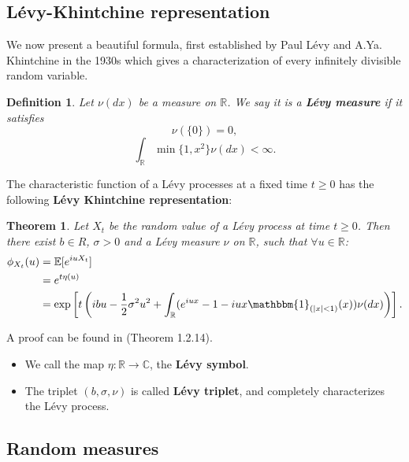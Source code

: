\documentclass[a4paper,10pt]{article}
\newcommand{\numberset}{\mathbb}
\newcommand{\R}{\numberset{R}}
\newcommand{\C}{\numberset{C}}
\newtheorem{Theorem}{Theorem}[section]
\newtheorem{Definition}{Definition}[section]
\begin{document}
\subsection{Lévy-Khintchine representation}

We now present a beautiful formula, first established by Paul Lévy and A.Ya. Khintchine in the 1930s
which gives a characterization of every infinitely divisible random variable.\\

\begin{Definition} \label{Levy_measure}
Let $\nu(dx)$ be a measure on $\R$. We say it is a \textbf{Lévy measure} if it satisfies
\begin{equation}
 \nu (\{ 0 \} ) = 0,
\end{equation}
\begin{equation} \label{Levy_m}
 \int_{\R} \min\{1, x^2\} \nu(dx) < \infty.
\end{equation}
\end{Definition}
The characteristic function of a Lévy processes at a fixed time $t\geq 0$ has the following \textbf{Lévy Khintchine representation}:
\begin{Theorem}
 Let $X_t$ be the random value of a Lévy process at time $t\geq0$. Then there exist $b\in R$, $\sigma>0$
 and a Lévy measure $\nu$ on $\R$, such that $\forall u \in \R$:
\begin{align}
\phi_{X_t}(u)  &= \mathbb{E} [e^{iuX_t}] \\ 
	     &= e^{t \eta(u)} \nonumber \\
	     &= \exp \left[ t \left( ibu - \frac{1}{2} \sigma^2 u^2 + \int_{\R} 
	         ( e^{iux} -1 -iux \mathbbm{1}_{(|x|<1)}(x) ) \nu(dx) \right) \right]. \nonumber		      
\end{align}
\end{Theorem}
A proof can be found in \cite{Applebaum} (Theorem 1.2.14).\\

\begin{itemize}
 \item We call the map $\eta : \R \to \C$, the \textbf{Lévy symbol}.
 \item The triplet $(b, \sigma, \nu)$ is called \textbf{Lévy triplet}, and completely characterizes the Lévy process.
\end{itemize}





\subsection{Random measures}\label{random_measures}
\end{document}
